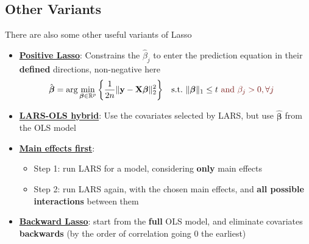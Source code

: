 \documentclass[twoside]{article}
\begin{document}
\subsection{Other Variants}
There are also some other useful variants of Lasso
\begin{itemize}
    \item \textbf{\underline{Positive Lasso}}: Constrains the $\hat{\beta}_j$ to enter the prediction equation in their \textbf{defined} directions, non-negative here 
    \begin{align*}
        \hat{\boldsymbol{\beta}} &= \arg\min_{\boldsymbol{\beta}\in \mathbb{R}^p}\left\{ \frac{1}{2n} \lVert \mathbf{y}-\mathbf{X}\boldsymbol{\beta} \rVert^2_2 \right\} & \text{s.t.\ } & \lVert \boldsymbol{\beta} \rVert _1 \leq t \textcolor{myred}{\text{ and } \beta_j>0, \forall j}
    \end{align*}
    \item \textbf{\underline{LARS-OLS hybrid}}: Use the covariates selected by LARS, but use $\hat{\boldsymbol{\beta}}$ from the OLS model 
    \item \textbf{\underline{Main effects first}}:
    \begin{itemize}
        \item Step 1: run LARS for a model, considering \textbf{only} main effects 
        \item Step 2: run LARS again, with the chosen main effects, and \textbf{all possible interactions} between them
    \end{itemize}
    \item \textbf{\underline{Backward Lasso}}: start from the \textbf{full} OLS model, and eliminate covariates \textbf{backwards} (by the order of correlation going 0 the earliest)
\end{itemize}
\end{document}
